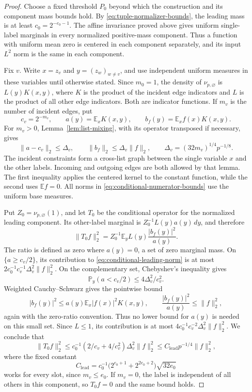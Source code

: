 \begin{proof}
Choose a fixed threshold \(P_0\) beyond which the construction and its
component mass bounds hold. By \eqref{eq:tuple-normalizer-bounds},
the leading mass is at least $c_0=2^{-e_0-1}$. The affine invariance
proved above gives uniform single-label marginals in every normalized
positive-mass component. Thus a function with uniform mean zero is
centered in each component separately, and its input $L^2$ norm is the
same in each component.

Fix \(v\).  Write \(x=z_v\) and \(y=(z_w)_{w\ne v}\), and use
independent uniform measures in these variables until otherwise stated.
Since \(m_0=1\), the density of \(\nu_{p,\varnothing}\) is
\(L(y)K(x,y)\), where \(K\) is the product of the incident edge
indicators and \(L\) is the product of all other edge indicators.
Both are indicator functions.  If \(m_v\) is the number of incident
edges, put
\[
 c_v=2^{-m_v},\qquad
 a(y)=\mathbb E_xK(x,y),\qquad
 b_f(y)=\mathbb E_xf(x)K(x,y).
\]
For \(m_v>0\), Lemma~\ref{lem:list-mixing}, with its operator
transposed if necessary, gives
\begin{equation}
 \|a-c_v\|_2\le\Delta_v,\qquad
 \|b_f\|_2\le\Delta_v\|f\|_2,
 \qquad
 \Delta_v=(32m_v)^{1/4}p^{-1/8}.
 \label{eq:conditional-numerator-bounds}
\end{equation}
The incident constraints form a cross-list graph between the single
variable \(x\) and the other labels.  Incoming and outgoing edges are
both allowed by that lemma.  The first inequality applies the centered
kernel to the constant function, while the second uses
\(\mathbb E f=0\).  All norms in
\eqref{eq:conditional-numerator-bounds} use the uniform base measures.

Put \(Z_0=\nu_{p,\varnothing}(1)\), and let \(T_0\) be the
conditional operator for the normalized leading component.  Its
other-label marginal is \(Z_0^{-1}L(y)a(y)\,dy\), and therefore
\begin{equation}
 \|T_0f\|_2^2
 =Z_0^{-1}\mathbb E_y L(y)\frac{|b_f(y)|^2}{a(y)}.
 \label{eq:conditional-leading-norm}
\end{equation}
The ratio is defined as zero where \(a(y)=0\), a set of zero marginal
mass.  On \(\{a\ge c_v/2\}\), its contribution to
\eqref{eq:conditional-leading-norm} is at most
\(2c_0^{-1}c_v^{-1}\Delta_v^2\|f\|_2^2\).
On the complementary set, Chebyshev's inequality gives
\[
 \mathbb P_y(a<c_v/2)\le4\Delta_v^2/c_v^2.
\]
Weighted Cauchy--Schwarz gives the pointwise bound
\[
 |b_f(y)|^2
 \le a(y)\mathbb E_x|f(x)|^2K(x,y),
 \qquad
 \frac{|b_f(y)|^2}{a(y)}\le\|f\|_2^2,
\]
again with the zero-ratio convention.  Thus no lower bound for
\(a(y)\) is needed on this small set.  Since \(L\le1\), its
contribution is at most
\(4c_0^{-1}c_v^{-2}\Delta_v^2\|f\|_2^2\).  We conclude that
\[
 \|T_0f\|_2^2
 \le c_0^{-1}(2/c_v+4/c_v^2)\Delta_v^2\|f\|_2^2
 \le C_{\mathrm{lead}}p^{-1/4}\|f\|_2^2,
\]
where the fixed constant
\[
 C_{\mathrm{lead}}
 =c_0^{-1}\bigl(2^{e_0+1}+2^{2e_0+2}\bigr)\sqrt{32e_0}
\]
works for every slot, since \(m_v\le e_0\).  If \(m_v=0\), the
label is independent of all others in this component, so \(T_0f=0\)
and the same bound holds.


\end{proof}
